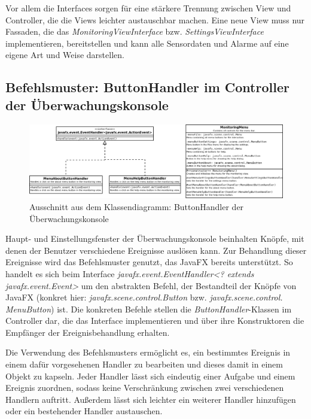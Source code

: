 \documentclass[parskip=full]{scrartcl}
\begin{document}
Vor allem die Interfaces sorgen für eine stärkere Trennung zwischen View und Controller, die die Views leichter austauschbar machen. Eine neue View muss nur Fassaden, die das
\emph{MonitoringViewInterface} bzw. \emph{SettingsViewInterface} implementieren, bereitstellen und kann alle Sensordaten und Alarme auf eine eigene Art und Weise darstellen.

\pagebreak
\subsection{Befehlsmuster: ButtonHandler im Controller der Überwachungskonsole}
\begin{figure}[H]
  \centering
  \includegraphics[scale=0.33]{design/pattern-screenshots/command-ButtonHandler.png}
  \caption{Ausschnitt aus dem Klassendiagramm: ButtonHandler der Überwachungskonsole}
\end{figure}
Haupt- und Einstellungsfenster der Überwachungskonsole beinhalten Knöpfe, mit denen der Benutzer verschiedene
Ereignisse auslösen kann. Zur Behandlung dieser Ereignisse wird das Befehlsmuster genutzt, das JavaFX bereits
unterstützt. So handelt es sich beim Interface \emph{javafx.event.EventHandler<? extends javafx.event.Event>}
um den abstrakten Befehl, der Bestandteil der Knöpfe von JavaFX (konkret hier: \emph{javafx.scene.control.Button} bzw. 
\emph{javafx.scene.control.\\MenuButton}) ist. Die konkreten Befehle stellen die \emph{ButtonHandler}-Klassen
im Controller dar, die das Interface implementieren und über ihre Konstruktoren die Empfänger der
Ereignisbehandlung erhalten.

Die Verwendung des Befehlsmusters ermöglicht es, ein bestimmtes Ereignis in einem dafür vorgesehenen Handler
zu bearbeiten und dieses damit in einem Objekt zu kapseln. Jeder Handler lässt sich eindeutig einer Aufgabe
und einem Ereignis zuordnen, sodass keine Verschränkung zwischen zwei verschiedenen Handlern auftritt.
Außerdem lässt sich leichter ein weiterer Handler hinzufügen oder ein bestehender Handler austauschen.

\pagebreak
\end{document}

